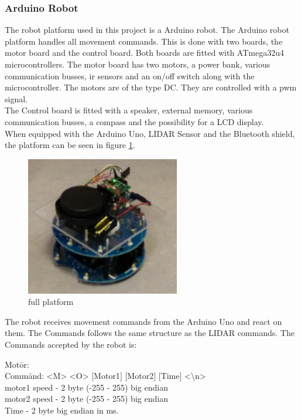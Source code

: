 \subsubsection{Arduino Robot}
The robot platform used in this project is a Arduino robot\cite{ArduinoRobot}. The Arduino robot platform handles all movement commands. This is done with two boards, the motor board and the control board. 
Both boards are fitted with ATmega32u4 microcontrollers. The motor board has two motors, a power bank, various communication busses, ir sensors and an on/off switch along with the microcontroller. 
The motors are of the type DC. They are controlled with a pwm signal.\\
The Control board is fitted with a speaker, external memory, various communication busses, a compass and the possibility for a LCD display.\\
When equipped with the Arduino Uno, LIDAR Sensor and the Bluetooth shield, the platform can be seen in figure \ref{fig:fullplatform}.
\begin{figure}[H]
\centering
\includegraphics[width=0.6\textwidth]{billeder/fullplatform}
\caption{full platform}
\label{fig:fullplatform}
\end{figure}

The robot receives movement commands from the Arduino Uno and react on them. The Commands follows the same structure as the LIDAR commands. The Commands accepted by the robot is: 

\begin{tabbing}	
{Mot}\={or:}\\
\> {Comm}\={and: <M> <O> $[$Motor1$]$ $[$Motor2$]$ $[$Time$]$ <\textbackslash n> } \\
\> \> motor1 speed - 2 byte (-255 - 255) big endian \\
\> \> motor2 speed - 2 byte (-255 - 255) big endian\\
\> \> Time   - 2 byte big endian in ms.
\end{tabbing}	

